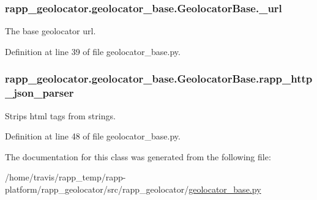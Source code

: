 \hypertarget{classrapp__geolocator_1_1geolocator__base_1_1GeolocatorBase_a67ea8297b7cfc1a51213a74a8b37e7d3}{
\subsubsection[{\-\_\-url}]{\setlength{\rightskip}{0pt plus 5cm}rapp\-\_\-geolocator.\-geolocator\-\_\-base.\-Geolocator\-Base.\-\_\-url\hspace{0.3cm}{\ttfamily [private]}}}\label{classrapp__geolocator_1_1geolocator__base_1_1GeolocatorBase_a67ea8297b7cfc1a51213a74a8b37e7d3}


The base geolocator url. 



Definition at line 39 of file geolocator\-\_\-base.\-py.

\hypertarget{classrapp__geolocator_1_1geolocator__base_1_1GeolocatorBase_ab425091819e4da22d68271fc98e849d1}{
\subsubsection[{rapp\-\_\-http\-\_\-json\-\_\-parser}]{\setlength{\rightskip}{0pt plus 5cm}rapp\-\_\-geolocator.\-geolocator\-\_\-base.\-Geolocator\-Base.\-rapp\-\_\-http\-\_\-json\-\_\-parser}}\label{classrapp__geolocator_1_1geolocator__base_1_1GeolocatorBase_ab425091819e4da22d68271fc98e849d1}


Strips html tags from strings. 



Definition at line 48 of file geolocator\-\_\-base.\-py.



The documentation for this class was generated from the following file\-:\begin{DoxyCompactItemize}
\item 
/home/travis/rapp\-\_\-temp/rapp-\/platform/rapp\-\_\-geolocator/src/rapp\-\_\-geolocator/\hyperlink{geolocator__base_8py}{geolocator\-\_\-base.\-py}\end{DoxyCompactItemize}
